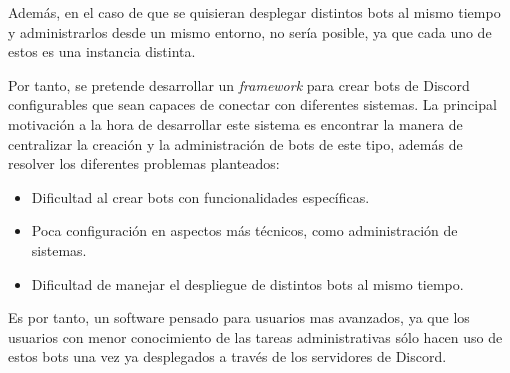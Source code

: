 Además, en el caso de que se quisieran desplegar distintos bots al mismo tiempo y administrarlos desde un mismo entorno, no sería posible, ya que cada uno de estos es una instancia distinta.

Por tanto, se pretende desarrollar un \textit{framework} para crear bots de Discord configurables que sean capaces de conectar con diferentes sistemas. La principal motivación a la hora de desarrollar este sistema es encontrar la manera de centralizar la creación y la administración de bots de este tipo, además de resolver los diferentes problemas planteados:

\begin{itemize}
	\item Dificultad al crear bots con funcionalidades específicas.
	\item Poca configuración en aspectos más técnicos, como administración de sistemas.
	\item Dificultad de manejar el despliegue de distintos bots al mismo tiempo.
\end{itemize}

Es por tanto, un software pensado para usuarios mas avanzados, ya que los usuarios con menor conocimiento de las tareas administrativas sólo hacen uso de estos bots una vez ya desplegados a través de los servidores de Discord.
